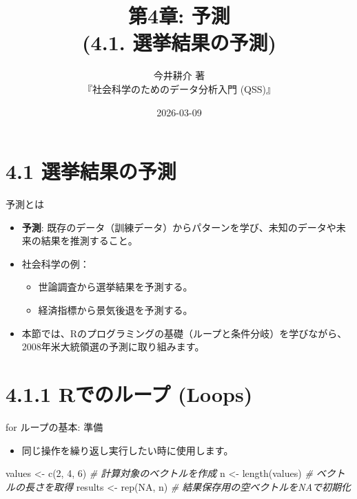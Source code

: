 \documentclass[
  ignorenonframetext,
]{beamer}
\title{第4章: 予測\\
(4.1. 選挙結果の予測)}
\subtitle{今井耕介 著\\
『社会科学のためのデータ分析入門 (QSS)』}
\author{}
\date{\vspace{-2.5em}2026-03-09}
\newenvironment{Shaded}{\begin{snugshade}}{\end{snugshade}}
\newcommand{\CommentTok}[1]{\textcolor[rgb]{0.56,0.35,0.01}{\textit{#1}}}
\newcommand{\ConstantTok}[1]{\textcolor[rgb]{0.00,0.00,0.00}{#1}}
\newcommand{\DecValTok}[1]{\textcolor[rgb]{0.00,0.00,0.81}{#1}}
\newcommand{\FunctionTok}[1]{\textcolor[rgb]{0.00,0.00,0.00}{#1}}
\newcommand{\NormalTok}[1]{#1}
\newcommand{\OtherTok}[1]{\textcolor[rgb]{0.56,0.35,0.01}{#1}}
\providecommand{\tightlist}{%
  \setlength{\itemsep}{0pt}\setlength{\parskip}{0pt}}
\begin{document}
\frame{\titlepage}

\hypertarget{ux9078ux6319ux7d50ux679cux306eux4e88ux6e2c}{%
\section{4.1
選挙結果の予測}\label{ux9078ux6319ux7d50ux679cux306eux4e88ux6e2c}}

\begin{frame}{予測とは}
\protect\hypertarget{ux4e88ux6e2cux3068ux306f}{}
\begin{itemize}
\tightlist
\item
  \textbf{予測}:
  既存のデータ（訓練データ）からパターンを学び、未知のデータや未来の結果を推測すること。
\item
  社会科学の例：

  \begin{itemize}
  \tightlist
  \item
    世論調査から選挙結果を予測する。
  \item
    経済指標から景気後退を予測する。
  \end{itemize}
\item
  本節では、Rのプログラミングの基礎（ループと条件分岐）を学びながら、2008年米大統領選の予測に取り組みます。
\end{itemize}
\end{frame}

\hypertarget{rux3067ux306eux30ebux30fcux30d7-loops}{%
\section{4.1.1 Rでのループ
(Loops)}\label{rux3067ux306eux30ebux30fcux30d7-loops}}

\begin{frame}[fragile]{for ループの基本: 準備}
\protect\hypertarget{for-ux30ebux30fcux30d7ux306eux57faux672c-ux6e96ux5099}{}
\begin{itemize}
\tightlist
\item
  同じ操作を繰り返し実行したい時に使用します。
\end{itemize}

\scriptsize

\begin{Shaded}
\begin{Highlighting}[]
\NormalTok{values }\OtherTok{\textless{}{-}} \FunctionTok{c}\NormalTok{(}\DecValTok{2}\NormalTok{, }\DecValTok{4}\NormalTok{, }\DecValTok{6}\NormalTok{) }\CommentTok{\# 計算対象のベクトルを作成}
\NormalTok{n }\OtherTok{\textless{}{-}} \FunctionTok{length}\NormalTok{(values)   }\CommentTok{\# ベクトルの長さを取得}
\NormalTok{results }\OtherTok{\textless{}{-}} \FunctionTok{rep}\NormalTok{(}\ConstantTok{NA}\NormalTok{, n) }\CommentTok{\# 結果保存用の空ベクトルをNAで初期化}
\end{Highlighting}
\end{Shaded}

\normalsize
\end{frame}
\end{document}

